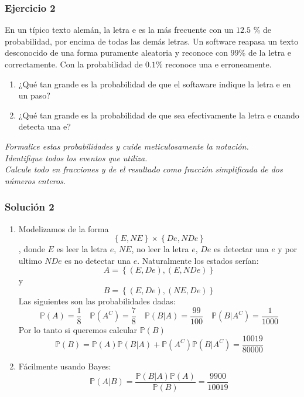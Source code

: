 \documentclass[notitlepage]{article}
\theoremstyle{definition}
\theoremstyle{remark}
\newcommand{\prob}[1]{\mathbb{P}(#1)}
\newcommand{\set}[1]{\left\lbrace #1 \right\rbrace}
\newcommand{\PP}{\mathbb{P}}
\begin{document}
	
	
	\subsubsection*{Ejercicio 2}
		En un típico texto alemán, la letra e es la más frecuente con un $12.5$ \% de probabilidad, por encima de todas las demás letras. Un software reapasa un texto desconocido de una forma puramente aleatoria y reconoce con $99$\% de la letra e correctamente. Con la probabilidad de $0.1$\% reconoce una e erroneamente.
		\begin{enumerate}[1.]
			\item ¿Qué tan grande es la probabilidad de que el softaware indique la letra e en un paso?
			\item ¿Qué tan grande es la probabilidad de que sea efectivamente la letra e cuando detecta una e?\\			
		\end{enumerate}
		\textit{Formalice estas probabilidades y cuide meticulosamente la notación.\\
			Identifique todos los eventos que utiliza.\\
			Calcule todo en fracciones y de el resultado como fracción simplificada de dos números enteros.}
		
	\subsubsection*{Solución 2}
		\begin{enumerate}[1.]
		\item Modelizamos de la forma \[ \set{E,NE} \times \set{ De,NDe }  \], donde $ E $ es leer la letra $ e $, $ NE $, no leer la letra $ e $, $ De $ es detectar una $ e $ y por ultimo $ NDe $ es no detectar una $ e $. Naturalmente los estados serían: \[ A = \set{(E, De), (E, NDe)} \] y \[ B = \set{(E,De),(NE,De)} \]
		Las siguientes son las probabilidades dadas:
		\[ \PP(A) = \frac{1}{8} \quad \PP(A^C) = \frac{7}{8} \quad \PP(B|A) = \frac{99}{100} \quad \PP(B|A^C) = \frac{1}{1000}  \]
		Por lo tanto si queremos calcular $ \PP(B) $
		\[ \mathbb{P}(B)=\prob{A}\mathbb{P}(B|A)+\prob{A^C}\prob{B|A^C} = \frac{10019}{80000} \]
		\item Fácilmente usando Bayes:
		\[ \prob{A|B} = \frac{\prob{B|A}\prob{A}}{\prob{B}} = \frac{9900}{10019}  \]
		\end{enumerate}	
	
	
\end{document}
